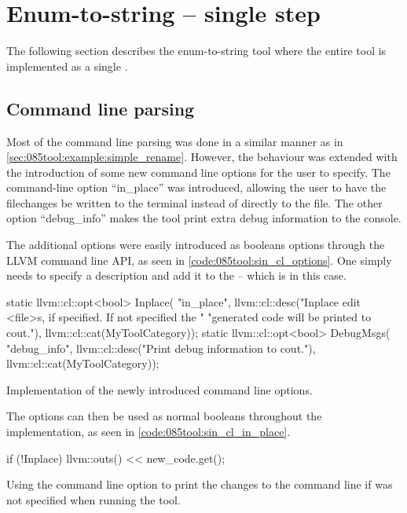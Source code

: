\section{Enum-to-string -- single step}
The following section describes the enum-to-string tool where the entire tool is implemented as a single .

\subsection{Command line parsing}
Most of the command line parsing was done in a similar manner as in \cref{sec:085tool:example:simple_rename}. However, the behaviour was extended with the introduction of some new command line options for the user to specify.
The command-line option ``in\_place'' was introduced, allowing the user to have the filechanges be written to the terminal instead of directly to the file.
The other option ``debug\_info'' makes the tool print extra debug information to the console.

The additional options were easily introduced as booleans options through the LLVM command line API, as seen in \cref{code:085tool:sin_cl_options}. One simply needs to specify a description and add it to the  -- which is  in this case.

\begin{listing}[H]
    \begin{cppcode}
static llvm::cl::opt<bool> Inplace(
    "in_place",
    llvm::cl::desc("Inplace edit <file>s, if specified. If not specified the "
                   "generated code will be printed to cout."),
    llvm::cl::cat(MyToolCategory));
static llvm::cl::opt<bool> DebugMsgs(
    "debug_info", llvm::cl::desc("Print debug information to cout."),
    llvm::cl::cat(MyToolCategory));
    \end{cppcode}
    \caption{Implementation of the newly introduced command line options.}
    \label{code:085tool:sin_cl_options}
\end{listing}

The options can then be used as normal booleans throughout the implementation, as seen in \cref{code:085tool:sin_cl_in_place}.

\begin{listing}[H]
    \begin{cppcode}
if (!Inplace) {
    llvm::outs() << new_code.get();
}
    \end{cppcode}
    \caption{Using the  command line option to print the changes to the command line if  was not specified when running the tool.}
    \label{code:085tool:sin_cl_in_place}
\end{listing}

